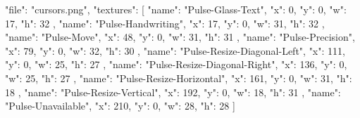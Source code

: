 {
  "file": "cursors.png",
  "textures": [
    {
      "name": "Pulse-Glass-Text",
      "x": 0,
      "y": 0,
      "w": 17,
      "h": 32
    },
    {
      "name": "Pulse-Handwriting",
      "x": 17,
      "y": 0,
      "w": 31,
      "h": 32
    },
    {
      "name": "Pulse-Move",
      "x": 48,
      "y": 0,
      "w": 31,
      "h": 31
    },
    {
      "name": "Pulse-Precision",
      "x": 79,
      "y": 0,
      "w": 32,
      "h": 30
    },
    {
      "name": "Pulse-Resize-Diagonal-Left",
      "x": 111,
      "y": 0,
      "w": 25,
      "h": 27
    },
    {
      "name": "Pulse-Resize-Diagonal-Right",
      "x": 136,
      "y": 0,
      "w": 25,
      "h": 27
    },
    {
      "name": "Pulse-Resize-Horizontal",
      "x": 161,
      "y": 0,
      "w": 31,
      "h": 18
    },
    {
      "name": "Pulse-Resize-Vertical",
      "x": 192,
      "y": 0,
      "w": 18,
      "h": 31
    },
    {
      "name": "Pulse-Unavailable",
      "x": 210,
      "y": 0,
      "w": 28,
      "h": 28
    }
  ]
}
